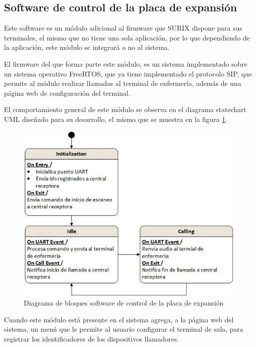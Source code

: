 \subsection{Software de control de la placa de expansión}
\label{subsec:SoftControl}

Este software es un módulo adicional al firmware que SURIX dispone para sus terminales, el mismo que no tiene una sola aplicación, por lo que dependiendo de la aplicación, este módulo se integrará o no al sistema.

El firmware del que forma parte este módulo, es un sistema implementado sobre un sistema operativo FreeRTOS, que ya tiene implementado el protocolo SIP, que permite al módulo realizar llamadas al terminal de enfermería, además de una página web de configuración del terminal.

El comportamiento general de este módulo se observa en el diagrama statechart UML diseñado para su desarrollo, el mismo que se muestra en la figura \ref{fig:DiagramaSoftControl}.

\begin{figure}[htpb]
	\centering
	\includegraphics[scale=0.8]{./Figures/Dcontrol.jpeg}
	\caption{Diagrama de bloques software de control de la placa de expansión}
	\label{fig:DiagramaSoftControl}
\end{figure}

Cuando este módulo está presente en el sistema agrega, a la página web del sistema, un menú que le permite al usuario configurar el terminal de sala, para registrar los identificadores de los dispositivos llamadores.


